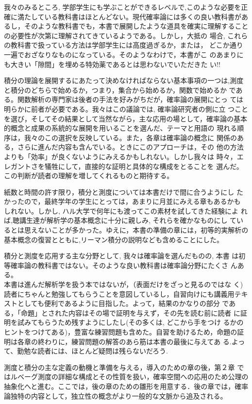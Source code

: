 \documentclass[14pt]{jsarticle}
\begin{document}
我々のみるところ, 学部学生にも学ぶことができるレベルで,このような必要を正確に満たしている教科書はほとんどない。現代確率論には多くの良い教科書があるし，そのような教科書でも，本書で展開したような道具を確実に理解することの必要性が次第に理解されてきているようである。しかし，大抵の 場合, これらの教科書で扱っている方法は学部学生には高度過ぎるか，または， どこか通り一遍でおざなりなものになっている。そのようなわけで，本書がこ のあまりにも大きい「隙間」を埋める特効薬であるとは思わないでいただきた い!!

積分の理論を展開するにあたって決めなければならない基本事項の一つは,測度と積分のどちらで始めるか，つまり，集合から始めるか，関数で始めるか である。関数解析の専門家は後者の手法を好みがちだが，確率論の展開にとっ ては明らかに前者が必要である。我々はこの議論では, 確率論研究者の側に立 つことを選び，そしてその結果として当然ながら，主な応用の場として，確率論の基本的概念と成果の系統的な展開を用いることを選んだ、テーマと用語の 現れる順序は，我々のこの選択を反映している。また，各章は確率論の概念に 関係のある，さらに進んだ内容も含んでいる。ときにこのアプローチは，その 他の方法よりも「効率」が良くないようにみえるかもしれない。しかし我々は 時々，エレガントさを犠牲にして，直接的な証明と具体的な構成をとることを 選んだ。この判断が読者の理解を増してくれるものと期待する。

紙数と時間の許す限り，積分と測度については本書だけで間に合うようにし たかったので，最終学年の学生にとっては，あまりに月並にみえる章もあるかも しれない。しかし, ハル大学で何年にも渡ってこの素材を試してきた経験によ れば,聴講生達が解析学の基本概念に十分に親しみ, それらを確かなものにし ているとは思えないことが多かった。ゆえに，本書の準備の章には，初等的実解析の基本概念の復習とともに,リーマン積分の説明なども含めることにした。

積分と測度を応用する主な分野として, 我々は確率論を選んだものの, 本書 は初等確率論の教科書ではない。そのような良い教科書は確率論分野にたくさ んある。\\
本書は進んだ解析学を扱う本ではないが，（表面だけをざっと見るのではな く) 読者にちゃんと勉強してもらうことを意図しているし，自習向けにも講義用テキストとしても便利であるように目指した。よって，結果のかなりの部分 である，「命題」とされた内容はその場で証明を与えず，その先を読む前に読者 に証明を試みてもらうため残すようにしたし(その多くは, どこから手をつけ るかのヒントをつけてある)，豊富な練習問題も含めた。自習を助けるため，命題の証明は各章の終わりに，練習問題の解答のあら筋は本書の最後に与えてあ る.よって、勤勉な読者には、ほとんど疑問は残らないだろう.

測度と積分の主な定義の動機と準備を与える，導入のための章の後，第２章 ではルベーグ測度の詳細な構成とその性質を扱い，確率空間への応用のため公理の抽象化へと進む。ここでは，後の章のための雛形を用意する．後の章では，確率論独特の内容として，独立性の概念がより一般的な文脈から追及される。
\end{document}

